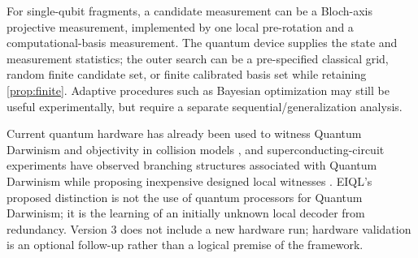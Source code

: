 For single-qubit fragments, a candidate measurement can be a Bloch-axis projective measurement, implemented by one local pre-rotation and a computational-basis measurement. The quantum device supplies the state and measurement statistics; the outer search can be a pre-specified classical grid, random finite candidate set, or finite calibrated basis set while retaining \cref{prop:finite}. Adaptive procedures such as Bayesian optimization may still be useful experimentally, but require a separate sequential/generalization analysis.

Current quantum hardware has already been used to witness Quantum Darwinism and objectivity in collision models \cite{chisholm2022,saini2020}, and superconducting-circuit experiments have observed branching structures associated with Quantum Darwinism while proposing inexpensive designed local witnesses \cite{zhu2025}. EIQL's proposed distinction is not the use of quantum processors for Quantum Darwinism; it is the learning of an initially unknown local decoder from redundancy. Version 3 does not include a new hardware run; hardware validation is an optional follow-up rather than a logical premise of the framework.
